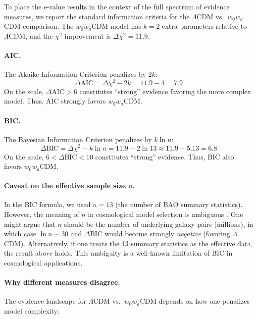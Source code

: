 \documentclass[11pt,a4paper]{article}
\newcommand{\LCDM}{$\Lambda$CDM}
\begin{document}
To place the e-value results in the context of the full spectrum of evidence measures, we report the standard information criteria for the \LCDM{} vs.\ $w_0w_a$CDM comparison. The $w_0w_a$CDM model has $k = 2$ extra parameters relative to \LCDM, and the $\chi^2$ improvement is $\Delta\chi^2 = 11.9$.

\paragraph{AIC.} The Akaike Information Criterion \citep{BurnhamAnderson2002} penalizes by $2k$:
\begin{equation}
\Delta\text{AIC} = \Delta\chi^2 - 2k = 11.9 - 4 = 7.9
\end{equation}
On the \citet{BurnhamAnderson2002} scale, $\Delta\text{AIC} > 6$ constitutes ``strong'' evidence favoring the more complex model. Thus, AIC strongly favors $w_0w_a$CDM.

\paragraph{BIC.} The Bayesian Information Criterion \citep{Schwarz1978} penalizes by $k \ln n$:
\begin{equation}
\Delta\text{BIC} = \Delta\chi^2 - k \ln n = 11.9 - 2 \ln 13 \approx 11.9 - 5.13 = 6.8
\end{equation}
On the \citet{KassRaftery1995} scale, $6 < \Delta\text{BIC} < 10$ constitutes ``strong'' evidence. Thus, BIC also favors $w_0w_a$CDM.

\paragraph{Caveat on the effective sample size $n$.} In the BIC formula, we used $n = 13$ (the number of BAO summary statistics). However, the meaning of $n$ in cosmological model selection is ambiguous \citep{Liddle2007}. One might argue that $n$ should be the number of underlying galaxy pairs (millions), in which case $\ln n \sim 30$ and $\Delta\text{BIC}$ would become strongly \textit{negative} (favoring \LCDM). Alternatively, if one treats the 13 summary statistics as the effective data, the result above holds. This ambiguity is a well-known limitation of BIC in cosmological applications.

\paragraph{Why different measures disagree.} The evidence landscape for \LCDM{} vs.\ $w_0w_a$CDM depends on how one penalizes model complexity:
\end{document}
